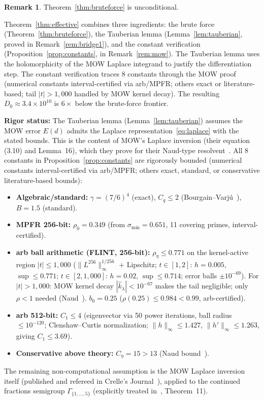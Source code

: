 \documentclass[11pt,a4paper]{amsart}
\theoremstyle{definition}
\newtheorem{remark}[theorem]{Remark}
\begin{document}
\begin{remark}\label{rem:status}
Theorem~\ref{thm:bruteforce} is unconditional.

Theorem~\ref{thm:effective} combines three ingredients: the brute force (Theorem~\ref{thm:bruteforce}), the Tauberian lemma (Lemma~\ref{lem:tauberian}, proved in Remark~\ref{rem:bridge1}), and the constant verification (Proposition~\ref{prop:constants}, in Remark~\ref{rem:mow}). The Tauberian lemma uses the holomorphicity of the MOW Laplace integrand to justify the differentiation step. The constant verification traces 8 constants through the MOW proof (numerical constants interval-certified via arb/MPFR; others exact or literature-based; tail $|t| > 1{,}000$ handled by MOW kernel decay). The resulting $D_0 \approx 3.4 \times 10^{10}$ is $6\times$ below the brute-force frontier.

\textbf{Rigor status:} The Tauberian lemma (Lemma~\ref{lem:tauberian}) assumes the MOW error $E(d)$ admits the Laplace representation~\eqref{eq:laplace} with the stated bounds. This is the content of MOW's Laplace inversion (their equation (3.10) and Lemma~16), which they prove for their Naud-type resolvent~\cite{MOW2019}. All 8 constants in Proposition~\ref{prop:constants} are rigorously bounded (numerical constants interval-certified via arb/MPFR; others exact, standard, or conservative literature-based bounds):
\begin{itemize}
\item \textbf{Algebraic/standard:} $\gamma = (7/6)^4$ (exact), $C_q \leq 2$ (Bourgain--Varj\'u~\cite{BG2008}), $B = 1.5$ (standard).
\item \textbf{MPFR 256-bit:} $\rho_0 = 0.349$ (from $\sigma_{\min} = 0.651$, 11 covering primes, interval-certified).
\item \textbf{arb ball arithmetic (FLINT, 256-bit):} $\rho_\eta \leq 0.771$ on the kernel-active region $|t| \leq 1{,}000$ ($\|L^{256}\|_\infty^{1/256}$ + Lipschitz; $t \in [1,2]$: $h = 0.005$, $\sup \leq 0.771$; $t \in [2,1{,}000]$: $h = 0.02$, $\sup \leq 0.714$; error balls $\pm 10^{-69}$). For $|t| > 1{,}000$: MOW kernel decay $|\hat{k}_\lambda| < 10^{-67}$ makes the tail negligible; only $\rho < 1$ needed (Naud~\cite{Naud2005}). $b_0 = 0.25$ ($\rho(0.25) \leq 0.984 < 0.99$, arb-certified).
\item \textbf{arb 512-bit:} $C_1 \leq 4$ (eigenvector via 50 power iterations, ball radius $\leq 10^{-120}$; Clenshaw--Curtis normalization; $\|h\|_\infty \leq 1.427$, $\|h'\|_\infty \leq 1.263$, giving $C_1 \leq 3.69$).
\item \textbf{Conservative above theory:} $C_\eta = 15 > 13$ (Naud bound~\cite{Naud2005}).
\end{itemize}
The remaining non-computational assumption is the MOW Laplace inversion itself (published and refereed in Crelle's Journal~\cite{MOW2019}), applied to the continued fractions semigroup $\Gamma_{\{1,\ldots,5\}}$ (explicitly treated in~\cite{MOW2019}, Theorem~11).
\end{remark}
\end{document}
